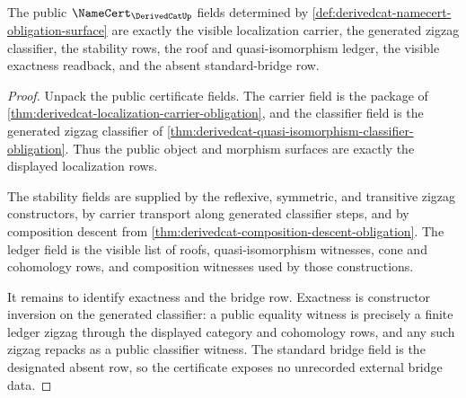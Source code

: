 \begin{theorem}
\label{thm:derivedcat-namecert-exactness-obligation}
The public $\NameCert_{\DerivedCatUp}$ fields determined by \autoref{def:derivedcat-namecert-obligation-surface} are exactly the visible localization carrier, the generated zigzag classifier, the stability rows, the roof and quasi-isomorphism ledger, the visible exactness readback, and the absent standard-bridge row.
\end{theorem}
\begin{proof}
Unpack the public certificate fields. The carrier field is the package of \autoref{thm:derivedcat-localization-carrier-obligation}, and the classifier field is the generated zigzag classifier of \autoref{thm:derivedcat-quasi-isomorphism-classifier-obligation}. Thus the public object and morphism surfaces are exactly the displayed localization rows.

The stability fields are supplied by the reflexive, symmetric, and transitive zigzag constructors, by carrier transport along generated classifier steps, and by composition descent from \autoref{thm:derivedcat-composition-descent-obligation}. The ledger field is the visible list of roofs, quasi-isomorphism witnesses, cone and cohomology rows, and composition witnesses used by those constructions.

It remains to identify exactness and the bridge row. Exactness is constructor inversion on the generated classifier: a public equality witness is precisely a finite ledger zigzag through the displayed category and cohomology rows, and any such zigzag repacks as a public classifier witness. The standard bridge field is the designated absent row, so the certificate exposes no unrecorded external bridge data.
\end{proof}

